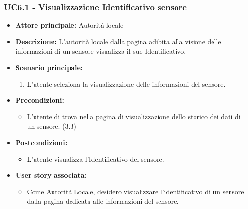 \subsubsection{UC6.1 - Visualizzazione Identificativo sensore}
\begin{itemize}
    \item \textbf{Attore principale:} Autorità locale;
    \item \textbf{Descrizione:} L’autorità locale dalla pagina adibita alla visione delle informazioni di un sensore visualizza il suo Identificativo.
    \item \textbf{Scenario principale:}
    \begin{enumerate}
        \item L'utente seleziona la visualizzazione delle informazioni del sensore.
    \end{enumerate}
\item \textbf{Precondizioni:}
    \begin{itemize}
        \item  L'utente di trova nella pagina di visualizzazione dello storico dei dati di un sensore. (3.3)
    \end{itemize}
    \item \textbf{Postcondizioni:}
          \begin{itemize}
              \item  L'utente visualizza l'Identificativo del sensore.
          \end{itemize}\item \textbf{User story associata:}
          \begin{itemize}
              \item Come Autorità Locale, desidero visualizzare l'identificativo di un sensore dalla pagina dedicata alle informazioni del sensore.
          \end{itemize}
\end{itemize}